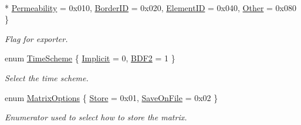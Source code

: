 \begin{DoxyCompactItemize}
\\*
\hyperlink{namespaceFVCode3D_ab3abc77722284ce4344be90bb61c1a41a23fa3ea40f896b28978ffc259e5281cf}{Permeability} = 0x010, 
\hyperlink{namespaceFVCode3D_ab3abc77722284ce4344be90bb61c1a41ae672dc66b11cd1f93a00d52d617a1866}{Border\+ID} = 0x020, 
\hyperlink{namespaceFVCode3D_ab3abc77722284ce4344be90bb61c1a41a864b9d45a578bf09e82a32916c9c3c03}{Element\+ID} = 0x040, 
\hyperlink{namespaceFVCode3D_ab3abc77722284ce4344be90bb61c1a41ab8c2eb493dc98b25b8fc2e3e176d4892}{Other} = 0x080
 \}\begin{DoxyCompactList}\small\item\em Flag for exporter. \end{DoxyCompactList}
\item 
enum \hyperlink{namespaceFVCode3D_ad641b84e1a5460b6a35354f61f27009a}{Time\+Scheme} \{ \hyperlink{namespaceFVCode3D_ad641b84e1a5460b6a35354f61f27009aa349f3bb73703f75dbaa1ba38998671d1}{Implicit} = 0, 
\hyperlink{namespaceFVCode3D_ad641b84e1a5460b6a35354f61f27009aa3cbb28a9274dccd4cacd41ad5d823bed}{B\+D\+F2} = 1
 \}\begin{DoxyCompactList}\small\item\em Select the time scheme. \end{DoxyCompactList}
\item 
enum \hyperlink{namespaceFVCode3D_a626a4d79a767db88306feab431240f48}{Matrix\+Options} \{ \hyperlink{namespaceFVCode3D_a626a4d79a767db88306feab431240f48aa66707b15fb7654854e39760f95fe1bf}{Store} = 0x01, 
\hyperlink{namespaceFVCode3D_a626a4d79a767db88306feab431240f48a404305166bee1d9f70fd4121aa96efe7}{Save\+On\+File} = 0x02
 \}\begin{DoxyCompactList}\small\item\em Enumerator used to select how to store the matrix. \end{DoxyCompactList}
\end{DoxyCompactItemize}

